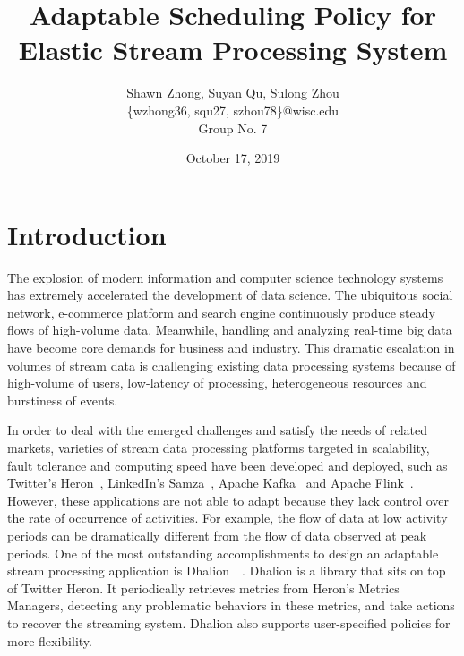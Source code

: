 \documentclass[pdftex,twocolumn,10pt,letterpaper]{article}
\begin{document}
\title{Adaptable Scheduling Policy for Elastic Stream Processing System}
\author{
    Shawn Zhong, Suyan Qu, Sulong Zhou \\
    \{wzhong36, squ27, szhou78\}@wisc.edu\\
    Group No. 7
}
\date{October 17, 2019}


\maketitle

\section{Introduction}

The explosion of modern information and computer science technology systems has extremely accelerated the development of data science. The ubiquitous social network, e-commerce platform and search engine continuously produce steady flows of high-volume data. Meanwhile, handling and analyzing real-time big data have become core demands for business and industry. This dramatic escalation in volumes of stream data is challenging existing data processing systems because of high-volume of users, low-latency of processing, heterogeneous resources and burstiness of events.  

In order to deal with the emerged challenges and satisfy the needs of related markets, varieties of stream data processing platforms targeted in scalability, fault tolerance and computing speed have been developed and deployed, such as Twitter’s Heron~\cite{Kulkarni:2015:THS:2723372.2742788}, LinkedIn’s Samza~\cite{Noghabi:2017:SSS:3137765.3137770}, Apache Kafka~\cite{kreps2011kafka} and Apache Flink~\cite{Carbone2015ApacheFS}. However, these applications are not able to adapt because they lack control over the rate of occurrence of activities. For example, the flow of data at low activity periods can be dramatically different from the flow of data observed at peak periods. One of the most outstanding accomplishments to design an adaptable stream processing application is Dhalion~\cite{Agrawal:2018:DAA:3229863.3275594}~\cite{Floratou:2017:DSS:3137765.3137786}. Dhalion is a library that sits on top of Twitter Heron. It periodically retrieves metrics from Heron's Metrics Managers, detecting any problematic behaviors in these metrics, and take actions to recover the streaming system. Dhalion also supports user-specified policies for more flexibility. 
\end{document}
